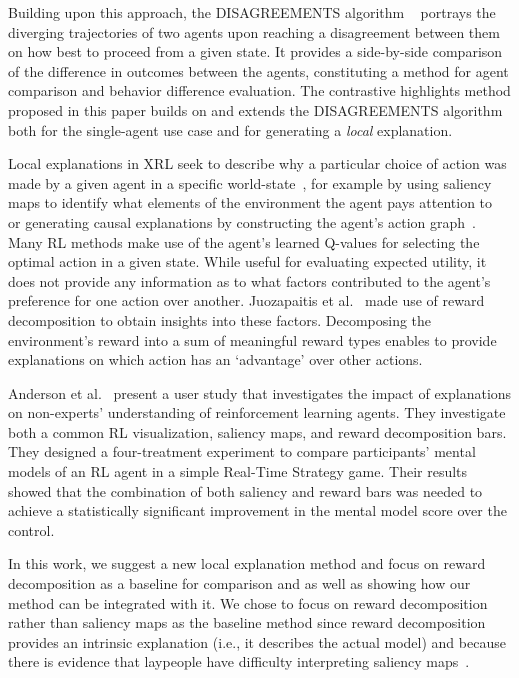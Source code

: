 \documentclass{ecai}
\begin{document}
Building upon this approach, the DISAGREEMENTS algorithm ~\cite{amitai2021don} portrays the diverging trajectories of two agents upon reaching a disagreement between them on how best to proceed from a given state. It provides a  side-by-side comparison of the difference in outcomes between the agents, constituting a method for agent comparison and behavior difference evaluation.
The contrastive highlights method proposed in this paper builds on and extends the DISAGREEMENTS algorithm both for the single-agent use case and for generating a \emph{local} explanation.

Local explanations in XRL seek to describe why a particular choice of action was made by a given agent in a specific world-state~\cite{tabrez2019explanation,dodson2011natural}, for example by using saliency maps to identify what elements of the environment the agent pays attention to~\cite{hilton2020understanding,huber2019,puri2020} or generating causal explanations by constructing the agent's action graph~\cite{madumal2020distal}.
Many RL methods make use of the agent's learned Q-values for selecting the optimal action in a given state. While useful for evaluating expected utility, it does not provide any information as to what factors contributed to the agent's preference for one action over another. Juozapaitis et al.~\cite{juozapaitis2019explainable} made use of reward decomposition to obtain insights into these factors. Decomposing the environment's reward into a sum of meaningful reward types enables to provide explanations on which action has an `advantage' over other actions. 

Anderson et al.~\cite{anderson2019explaining}
present a user study that investigates the impact of explanations on non-experts' understanding of reinforcement learning agents. They investigate both a common RL visualization, saliency maps, and reward decomposition bars. They designed a four-treatment experiment to compare participants' mental models of an RL agent in a simple Real-Time Strategy game. Their results showed that the combination of both saliency and reward bars was needed to achieve a statistically significant improvement in the mental model score over the control.

In this work, we suggest a new local explanation method and focus on reward decomposition as a baseline for comparison and as well as showing how our method can be integrated with it. We chose to focus on reward decomposition rather than saliency maps as the baseline method since reward decomposition provides an intrinsic explanation (i.e., it describes the actual model) and because there is evidence that laypeople have difficulty interpreting saliency maps~\cite{huber2021local}.
 
\end{document}
